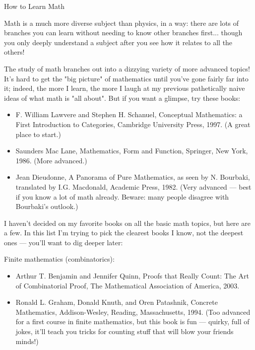 \documentclass[10pt,a4paper]{book}
\theoremstyle{definition}
\begin{document}
How to Learn Math

Math is a much more diverse subject than physics, in a way: there are lots of branches you can learn without needing to know other branches first... though you only deeply understand a subject after you see how it relates to all the others!

The study of math branches out into a dizzying variety of more advanced topics! It's hard to get the "big picture" of mathematics until you've gone fairly far into it; indeed, the more I learn, the more I laugh at my previous pathetically naive ideas of what math is "all about". But if you want a glimpse, try these books:

\begin{itemize}
\item F. William Lawvere and Stephen H. Schanuel, Conceptual Mathematics: a First Introduction to Categories, Cambridge University Press, 1997. (A great place to start.)

\item Saunders Mac Lane, Mathematics, Form and Function, Springer, New York, 1986. (More advanced.)

\item Jean Dieudonne, A Panorama of Pure Mathematics, as seen by N. Bourbaki, translated by I.G. Macdonald, Academic Press, 1982. (Very advanced — best if you know a lot of math already. Beware: many people disagree with Bourbaki's outlook.)
\end{itemize}

I haven't decided on my favorite books on all the basic math topics, but here are a few. In this list I'm trying to pick the clearest books I know, not the deepest ones — you'll want to dig deeper later:

Finite mathematics (combinatorics):

\begin{itemize}
\item Arthur T. Benjamin and Jennifer Quinn, Proofs that Really Count: The Art of Combinatorial Proof, The Mathematical Association of America, 2003.

\item Ronald L. Graham, Donald Knuth, and Oren Patashnik, Concrete Mathematics, Addison-Wesley, Reading, Massachusetts, 1994. (Too advanced for a first course in finite mathematics, but this book is fun — quirky, full of jokes, it'll teach you tricks for counting stuff that will blow your friends minds!)
\end{itemize}
\end{document}
